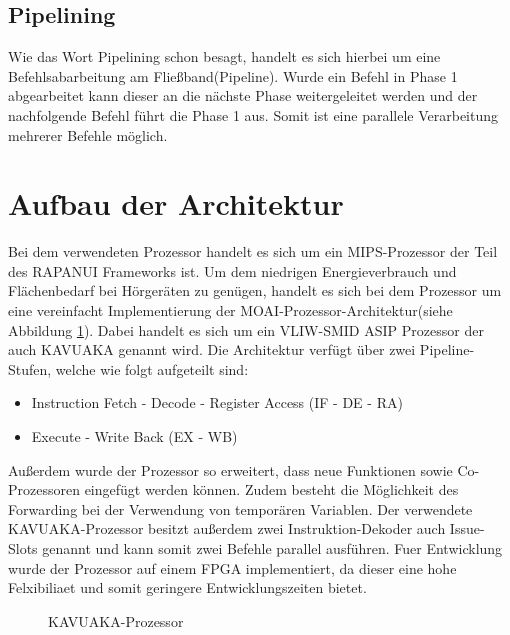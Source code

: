 \subsection{Pipelining}
Wie das Wort Pipelining schon besagt, handelt es sich hierbei um eine Befehlsabarbeitung am Fließband(Pipeline). Wurde ein Befehl in Phase 1 abgearbeitet kann dieser an die nächste Phase weitergeleitet werden und der nachfolgende Befehl führt die Phase 1 aus. Somit ist eine parallele Verarbeitung mehrerer Befehle möglich. 

\section{Aufbau der Architektur}
\label{chap:architecture_overview}
Bei dem verwendeten Prozessor handelt es sich um ein MIPS-Prozessor der Teil des RAPANUI Frameworks ist.
Um dem niedrigen Energieverbrauch und Flächenbedarf bei Hörgeräten zu genügen, handelt es sich bei dem Prozessor um eine vereinfacht Implementierung der MOAI-Prozessor-Architektur(siehe Abbildung \ref{fig:KAVUAKA}). Dabei handelt es sich um ein VLIW-SMID ASIP Prozessor der auch KAVUAKA genannt wird. Die Architektur verfügt über zwei Pipeline-Stufen, welche wie folgt aufgeteilt sind: 
\begin{itemize}
	\item[1.] Instruction Fetch - Decode - Register Access (IF - DE - RA) 
	\item[2.] Execute - Write Back (EX - WB)
\end{itemize}
Außerdem wurde der Prozessor so erweitert, dass neue Funktionen sowie Co-Prozessoren eingefügt werden können. Zudem besteht die Möglichkeit des Forwarding bei der Verwendung von temporären Variablen.
Der verwendete KAVUAKA-Prozessor besitzt außerdem zwei Instruktion-Dekoder auch Issue-Slots genannt und kann somit zwei Befehle parallel ausführen.
Fuer Entwicklung wurde der Prozessor auf einem FPGA implementiert, da dieser eine hohe Felxibiliaet und somit geringere Entwicklungszeiten bietet.

\begin{scriptsize}
	\begin{figure}[htbp] 
		\centering
		
		\caption{KAVUAKA-Prozessor}
		\label{fig:KAVUAKA}
	\end{figure}
\end{scriptsize}


